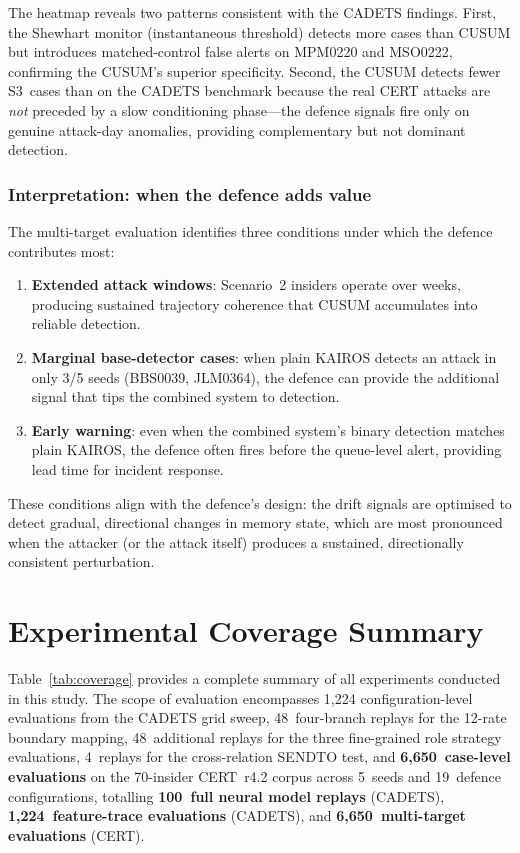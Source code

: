 \documentclass[10pt,twocolumn]{article}
\begin{document}
The heatmap reveals two patterns consistent with the CADETS findings.
First, the Shewhart monitor (instantaneous threshold) detects more cases
than CUSUM but introduces matched-control false alerts on MPM0220 and
MSO0222, confirming the CUSUM's superior specificity.  Second, the CUSUM
detects fewer S3~cases than on the CADETS benchmark because the real
CERT attacks are \emph{not} preceded by a slow conditioning phase---the
defence signals fire only on genuine attack-day anomalies, providing
complementary but not dominant detection.

\subsubsection{Interpretation: when the defence adds value}

The multi-target evaluation identifies three conditions under which the
defence contributes most:

\begin{enumerate}
  \item \textbf{Extended attack windows}: Scenario~2 insiders operate over
    weeks, producing sustained trajectory coherence that CUSUM accumulates
    into reliable detection.
  \item \textbf{Marginal base-detector cases}: when plain KAIROS detects
    an attack in only 3/5 seeds (BBS0039, JLM0364), the defence can
    provide the additional signal that tips the combined system to detection.
  \item \textbf{Early warning}: even when the combined system's binary
    detection matches plain KAIROS, the defence often fires before the
    queue-level alert, providing lead time for incident response.
\end{enumerate}

These conditions align with the defence's design: the drift signals are
optimised to detect gradual, directional changes in memory state, which are
most pronounced when the attacker (or the attack itself) produces a
sustained, directionally consistent perturbation.


\section{Experimental Coverage Summary}
\label{sec:coverage}

Table~\ref{tab:coverage} provides a complete summary of all experiments
conducted in this study.  The scope of evaluation encompasses 1,224
configuration-level evaluations from the CADETS grid sweep, 48~four-branch
replays for the 12-rate boundary mapping, 48~additional replays
for the three fine-grained role strategy evaluations, 4~replays for the
cross-relation SENDTO test, and \textbf{6,650~case-level evaluations}
on the 70-insider CERT~r4.2 corpus across 5~seeds and 19~defence
configurations, totalling \textbf{100~full neural model replays}
(CADETS), \textbf{1,224~feature-trace evaluations} (CADETS), and
\textbf{6,650~multi-target evaluations} (CERT).
\end{document}
